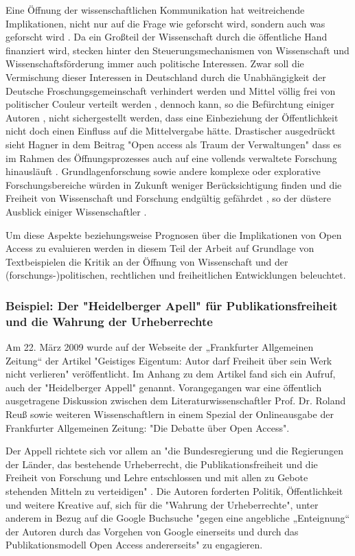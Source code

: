 Eine Öffnung der wissenschaftlichen Kommunikation hat weitreichende Implikationen, nicht nur auf die Frage wie geforscht wird, sondern auch was geforscht wird \cite{suchen}. Da ein Großteil der Wissenschaft durch die öffentliche Hand finanziert wird, stecken hinter den Steuerungsmechanismen von Wissenschaft und Wissenschaftsförderung immer auch politische Interessen. Zwar soll die Vermischung dieser Interessen in Deutschland durch die Unabhängigkeit der Deutsche Froschungsgemeinschaft verhindert werden und Mittel völlig frei von politischer Couleur verteilt werden \cite{suchen}, dennoch kann, so die Befürchtung einiger Autoren \cite{suchen}, nicht sichergestellt werden, dass eine Einbeziehung der Öffentlichkeit nicht doch einen Einfluss auf die Mittelvergabe hätte. Drastischer ausgedrückt sieht Hagner in dem Beitrag "Open access als Traum der Verwaltungen" dass es im Rahmen des Öffnungsprozesses auch auf eine vollends verwaltete Forschung hinausläuft \cite{suchen}. Grundlagenforschung sowie andere komplexe oder explorative Forschungsbereiche würden in Zukunft weniger Berücksichtigung finden und die Freiheit von Wissenschaft und Forschung endgültig gefährdet \cite{suchen}, so der düstere Ausblick einiger Wissenschaftler \cite{suchen} \cite{suchen}. 

Um diese Aspekte beziehungsweise Prognosen über die Implikationen von Open Access zu evaluieren werden in diesem Teil der Arbeit auf Grundlage von Textbeispielen die Kritik an der Öffnung von Wissenschaft und der (forschungs-)politischen, rechtlichen und freiheitlichen Entwicklungen beleuchtet.

\subsubsection{Beispiel: Der "Heidelberger Apell" für Publikationsfreiheit und die Wahrung der Urheberrechte }

Am 22. März 2009 wurde auf der Webseite der „Frankfurter Allgemeinen Zeitung“ der Artikel "Geistiges Eigentum: Autor darf Freiheit über sein Werk nicht verlieren" \cite{faz_heidelberger_apell_2009} veröffentlicht. Im Anhang zu dem Artikel fand sich ein Aufruf, auch der "Heidelberger Appell" genannt. Vorangegangen war eine öffentlich ausgetragene Diskussion zwischen dem Literaturwissenschaftler Prof. Dr. Roland Reuß sowie weiteren Wissenschaftlern in einem Spezial der Onlineausgabe der Frankfurter Allgemeinen Zeitung: "Die Debatte über Open Access".

Der Appell richtete sich vor allem an "die Bundesregierung und die Regierungen der Länder, das bestehende Urheberrecht, die Publikationsfreiheit und die Freiheit von Forschung und Lehre entschlossen und mit allen zu Gebote stehenden Mitteln zu verteidigen" \cite{ITK_2009}. Die Autoren forderten Politik, Öffentlichkeit und weitere Kreative auf, sich für die "Wahrung der Urheberrechte", unter anderem in Bezug auf die Google Buchsuche "gegen eine angebliche „Enteignung“ der Autoren durch das Vorgehen von Google einerseits und durch das Publikationsmodell Open Access andererseits" \cite{WD_bundestag_2009} zu engagieren. 

